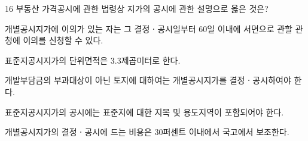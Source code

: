\begin{question}{16}
부동산 가격공시에 관한 법령상 지가의 공시에 관한 설명으로 옳은 것은?
\begin{choices}
  \item 개별공시지가에 이의가 있는 자는 그 결정ㆍ공시일부터 60일 이내에 서면으로 관할 관청에 이의를 신청할 수 있다.
  \item 표준지공시지가의 단위면적은 3.3제곱미터로 한다.
  \item 개발부담금의 부과대상이 아닌 토지에 대하여는 개별공시지가를 결정ㆍ공시하여야 한다.
  \item 표준지공시지가의 공시에는 표준지에 대한 지목 및 용도지역이 포함되어야 한다.
  \item 개별공시지가의 결정ㆍ공시에 드는 비용은 30퍼센트 이내에서 국고에서 보조한다.
\end{choices}
\end{question}

